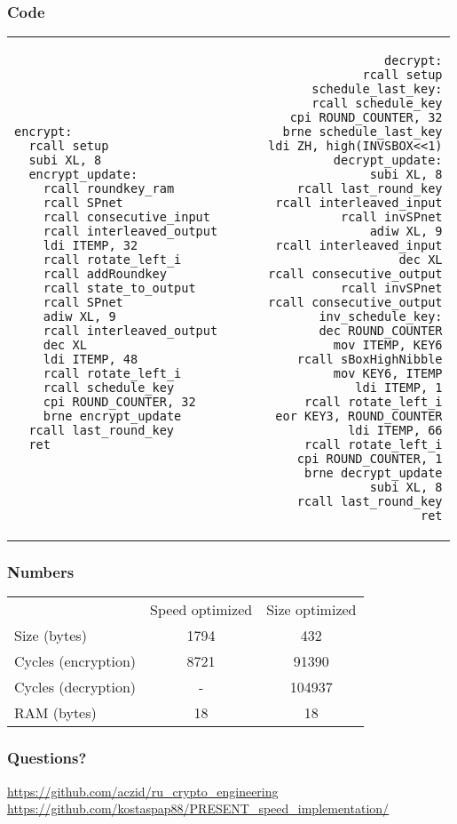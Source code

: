 \documentclass{beamer}
\begin{document}
\lstset{basicstyle=\tiny\sffamily}
\begin{frame}[fragile]
\frametitle{Code}
	\begin{tabular}{ l r }
\begin{lstlisting}
encrypt:
  rcall setup
  subi XL, 8
  encrypt_update:
    rcall roundkey_ram
    rcall SPnet
    rcall consecutive_input
    rcall interleaved_output
    ldi ITEMP, 32
    rcall rotate_left_i
    rcall addRoundkey
    rcall state_to_output
    rcall SPnet
    adiw XL, 9
    rcall interleaved_output
    dec XL
    ldi ITEMP, 48
    rcall rotate_left_i
    rcall schedule_key
    cpi ROUND_COUNTER, 32
    brne encrypt_update
  rcall last_round_key
  ret
\end{lstlisting}
&
\begin{lstlisting}
decrypt:
  rcall setup
  schedule_last_key:
    rcall schedule_key
    cpi ROUND_COUNTER, 32
    brne schedule_last_key
  ldi ZH, high(INVSBOX<<1)
  decrypt_update:
    subi XL, 8
    rcall last_round_key
    rcall interleaved_input
    rcall invSPnet
    adiw XL, 9
    rcall interleaved_input
    dec XL
    rcall consecutive_output
    rcall invSPnet
    rcall consecutive_output
    inv_schedule_key:
      dec ROUND_COUNTER
      mov ITEMP, KEY6
      rcall sBoxHighNibble
      mov KEY6, ITEMP
      ldi ITEMP, 1
      rcall rotate_left_i
      eor KEY3, ROUND_COUNTER
      ldi ITEMP, 66
      rcall rotate_left_i
    cpi ROUND_COUNTER, 1
    brne decrypt_update
  subi XL, 8
  rcall last_round_key
  ret
\end{lstlisting}
	\end{tabular}
\end{frame}


\begin{frame}[fragile]
\frametitle{Numbers}
	\begin{tabular}{ l c c }

                & Speed optimized & Size optimized \\
        Size (bytes) & 1794 & 432 \\
        Cycles (encryption) & 8721 & 91390 \\
        Cycles (decryption) & - & 104937 \\
        RAM (bytes) & 18 & 18

	\end{tabular}
\end{frame}

\begin{frame}[fragile]
\frametitle{Questions?}
	\footnotesize{
	\url{https://github.com/aczid/ru_crypto_engineering}
	\url{https://github.com/kostaspap88/PRESENT_speed_implementation/}
	}
\end{frame}
\end{document}
